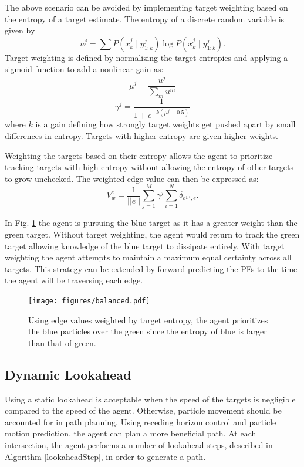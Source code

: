 \documentclass[letterpaper, 10 pt, conference]{ieeeconf}  %
\begin{document}
The above scenario can be avoided by implementing target weighting based on the entropy of a target estimate. The entropy \cite{Shannon1948} of a discrete random variable is given by
\begin{equation}%
    u^j = \sum{P(x^j_k \mid y^j_{1:k})\log P(x^j_k \mid y^j_{1:k})}.
\end{equation}
Target weighting is defined by normalizing the target entropies and applying a sigmoid function to add a nonlinear gain as:
\begin{equation}%
    \mu^j = \frac{u^j}{\sum_m u^m}
\end{equation}
\begin{equation}\label{eq:sigmoid}
    \gamma^j = \frac{1}{1 + e^{-k(\mu^j - 0.5)}}
\end{equation}
where $k$ is a gain defining how strongly target weights get pushed apart by small differences in entropy. Targets with higher entropy are given higher weights.

Weighting the targets based on their entropy allows the agent to prioritize tracking targets with high entropy without allowing the entropy of other targets to grow unchecked. The weighted edge value can then be expressed as:
\begin{equation}\label{eq:weighted_value}
    V_w^e = \frac{1}{||e||}\sum_{j=1}^M \gamma^j \sum_{i=1}^{N}\delta_{e^{j,i},e}.
\end{equation}

In Fig. \ref{fig:balanced} the agent is pursuing the blue target as it has a greater weight than the green target. Without target weighting, the agent would return to track the green target allowing knowledge of the blue target to dissipate entirely. With target weighting the agent attempts to maintain a maximum equal certainty across all targets. This strategy can be extended by forward predicting the PFs to the time the agent will be traversing each edge.

\begin{figure}
\centering
\texttt{[image: figures/balanced.pdf]}
\caption{Using edge values weighted by target entropy, the agent prioritizes the blue particles over the green since the entropy of blue is larger than that of green.}
\label{fig:balanced}
\end{figure}

\subsection{Dynamic Lookahead}
Using a static lookahead is acceptable when the speed of the targets is negligible compared to the speed of the agent. Otherwise, particle movement should be accounted for in path planning. Using receding horizon control and particle motion prediction, the agent can plan a more beneficial path. At each intersection, the agent performs a number of lookahead steps, described in Algorithm \ref{lookaheadStep}, in order to generate a path.
\end{document}
